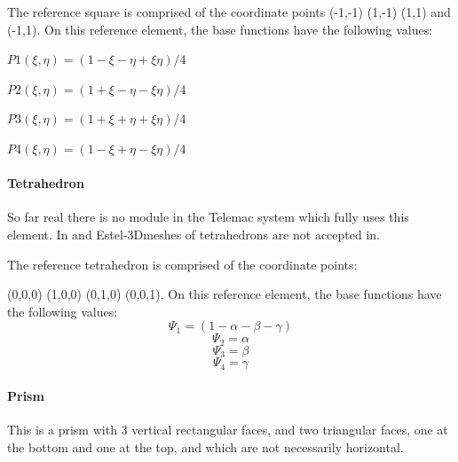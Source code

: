 The reference square is comprised of the coordinate points (-1,-1)  (1,-1)  (1,1) and (-1,1). On this reference element, the base functions have the following values:

$P1(\xi,\eta) = ( 1 - \xi- \eta + \xi\eta)/4$

$P2(\xi,\eta) = ( 1 + \xi- \eta - \xi\eta)/4$

$P3(\xi,\eta) = ( 1 + \xi+ \eta + \xi\eta)/4$

$P4(\xi,\eta) = ( 1 - \xi+ \eta - \xi\eta)/4$

\paragraph{Tetrahedron}

So far real there is no module in the Telemac system which fully uses this
element. In  and Estel-3Dmeshes of tetrahedrons are not accepted
in.

The reference tetrahedron is comprised of the coordinate points:

(0,0,0)  (1,0,0)  (0,1,0)  (0,0,1). On this reference element, the base
functions have the following values:
\[\Psi _{1} =(1-\alpha -\beta -\gamma )\]
\[\Psi _{2} =\alpha \]
\[\Psi _{3} =\beta \]
\[\Psi _{4} =\gamma \]

\paragraph{Prism}

This is a prism with 3 vertical rectangular faces, and two triangular faces,
one at the bottom and one at the top, and which are not necessarily horizontal.

